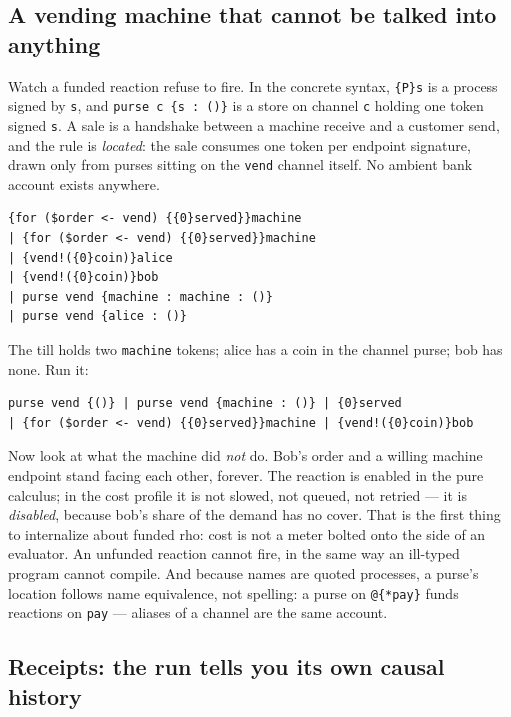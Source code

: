 \documentclass[11pt]{article}
\newcommand{\code}[1]{\texttt{#1}}
\begin{document}
\subsection{A vending machine that cannot be talked into anything}

Watch a funded reaction refuse to fire.  In the concrete syntax,
\code{\{P\}s} is a process signed by \code{s}, and
\code{purse c \{s : ()\}} is a store on channel \code{c} holding one
token signed \code{s}.  A sale is a handshake between a machine receive
and a customer send, and the rule is \emph{located}: the sale consumes
one token per endpoint signature, drawn only from purses sitting on the
\code{vend} channel itself.  No ambient bank account exists anywhere.

\begin{lstlisting}
{for ($order <- vend) {{0}served}}machine
| {for ($order <- vend) {{0}served}}machine
| {vend!({0}coin)}alice
| {vend!({0}coin)}bob
| purse vend {machine : machine : ()}
| purse vend {alice : ()}
\end{lstlisting}

\noindent
The till holds two \code{machine} tokens; alice has a coin in the
channel purse; bob has none.  Run it:

\begin{lstlisting}
purse vend {()} | purse vend {machine : ()} | {0}served
| {for ($order <- vend) {{0}served}}machine | {vend!({0}coin)}bob
\end{lstlisting}

\noindent
Now look at what the machine did \emph{not} do.  Bob's order and a
willing machine endpoint stand facing each other, forever.  The reaction
is enabled in the pure calculus; in the cost profile it is not slowed,
not queued, not retried --- it is \emph{disabled}, because bob's share of
the demand has no cover.  That is the first thing to internalize about
funded rho: cost is not a meter bolted onto the side of an evaluator.
An unfunded reaction cannot fire, in the same way an ill-typed program
cannot compile.  And because names are quoted processes, a purse's
location follows name equivalence, not spelling: a purse on
\code{@\{*pay\}} funds reactions on \code{pay} --- aliases of a channel
are the same account.

\subsection{Receipts: the run tells you its own causal history}
\end{document}
